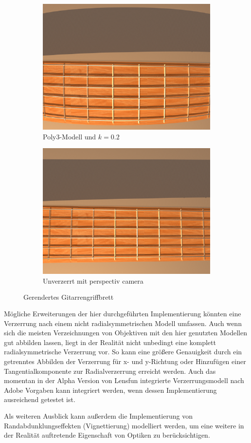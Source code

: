 \begin{figure}[h]
	\begin{subfigure}{.5\textwidth}
		\raggedleft
		\includegraphics[width=\textwidth]{img/guitarDistorted.png}
		\caption{Poly3-Modell und $k=0.2$}
	\end{subfigure}
\begin{subfigure}{.5\textwidth}
		\raggedright
		\includegraphics[width=\textwidth, ]{img/guitarUndist.png}
		\caption{Unverzerrt mit perspectiv camera}
	\end{subfigure}
\caption{Gerendertes Gitarrengriffbrett}
\label{fig:Guitar}
\end{figure}


Mögliche Erweiterungen der hier durchgeführten Implementierung könnten eine Verzerrung nach einem nicht radialsymmetrischen Modell umfassen. Auch wenn sich die meisten Verzeichnungen von Objektiven mit den hier genutzten Modellen gut abbilden lassen, liegt in der Realität nicht unbedingt eine komplett radialsymmetrische Verzerrung vor. So kann eine größere Genauigkeit durch ein getrenntes Abbilden der Verzerrung für x- und y-Richtung oder Hinzufügen einer Tangentialkomponente zur Radialverzerrung erreicht werden. Auch das momentan in der Alpha Version von Lensfun integrierte Verzerrungsmodell nach Adobe Vorgaben kann integriert werden, wenn dessen Implementierung ausreichend getestet ist. 

Als weiteren Ausblick kann außerdem die Implementierung von Randabdunklungseffekten (Vignettierung) modelliert werden, um eine weitere in der Realität auftretende Eigenschaft von Optiken zu berücksichtigen. 